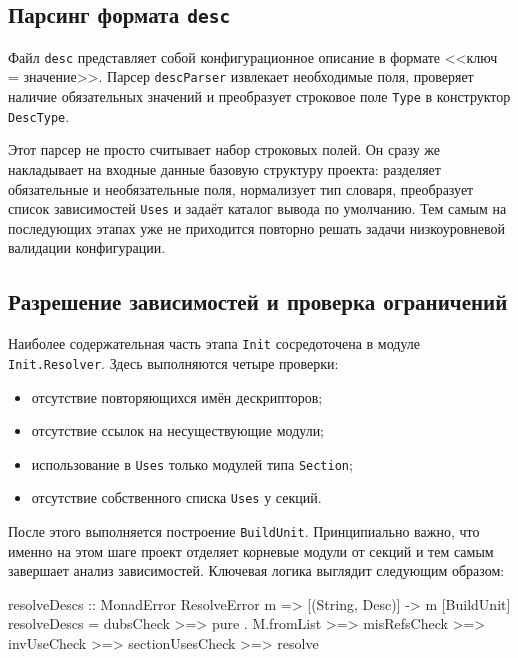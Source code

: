 \documentclass[a4paper,12pt]{article}
\begin{document}
\subsection{Парсинг формата \texttt{desc}}

Файл \texttt{desc} представляет собой конфигурационное описание в формате
<<ключ = значение>>.
Парсер \texttt{descParser} извлекает необходимые поля, проверяет наличие
обязательных значений и преобразует строковое поле \texttt{Type} в конструктор
\texttt{DescType}.

Этот парсер не просто считывает набор строковых полей. Он
сразу же накладывает на входные данные базовую структуру проекта: разделяет обязательные
и необязательные поля, нормализует тип словаря, преобразует список зависимостей
\texttt{Uses} и задаёт каталог вывода по умолчанию. Тем самым на последующих этапах уже
не приходится повторно решать задачи низкоуровневой валидации конфигурации.

\subsection{Разрешение зависимостей и проверка ограничений}

Наиболее содержательная часть этапа \texttt{Init} сосредоточена в модуле
\texttt{Init.Resolver}. Здесь выполняются четыре проверки:
\begin{itemize}
  \item отсутствие повторяющихся имён дескрипторов;
  \item отсутствие ссылок на несуществующие модули;
  \item использование в \texttt{Uses} только модулей типа \texttt{Section};
  \item отсутствие собственного списка \texttt{Uses} у секций.
\end{itemize}

После этого выполняется построение \texttt{BuildUnit}. Принципиально важно, что именно
на этом шаге проект отделяет корневые модули от секций и тем самым завершает анализ
зависимостей. Ключевая логика выглядит следующим образом:

\begin{flushleft}
\label{lst:init-resolve}
\begin{MyCodes}
resolveDescs :: MonadError ResolveError m => [(String, Desc)] -> m [BuildUnit]
resolveDescs
  =   dubsCheck
  >=> pure . M.fromList
  >=> misRefsCheck
  >=> invUseCheck
  >=> sectionUsesCheck
  >=> resolve
\end{MyCodes}
\end{flushleft}
\end{document}
